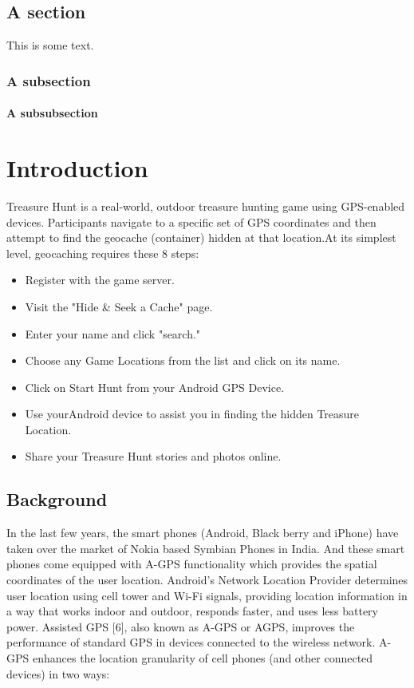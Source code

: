 \documentclass[12pt]{report}
\begin{document}
\section{A section}
This is some text.
\subsection{A subsection}
\subsubsection{A subsubsection}

\chapter{ Introduction}
	Treasure Hunt is a real-world, outdoor treasure hunting game using GPS-enabled devices. Participants navigate to a specific set of GPS coordinates and then attempt to find the geocache (container) hidden at that location.At its simplest level, geocaching requires these 8 steps:
	\begin{itemize}
	
	
	
	  \item Register with the game server.
	  \item Visit the "Hide & Seek a Cache" page.
	  \item Enter your name  and click "search."
	  \item Choose any Game Locations from the list and click on its name.
	  \item Click on Start Hunt from your Android  GPS Device.
	  \item Use yourAndroid  device to assist you in finding the hidden Treasure Location.
	   \item Share your Treasure Hunt stories and photos online.
	 
	\end{itemize}
	
	\section{Background}
	In the last few years, the smart phones (Android, Black 
	berry and iPhone) have taken over the market of Nokia 
	based Symbian Phones in India. And these smart phones 
	come equipped with A-GPS functionality which provides 
	the spatial coordinates of the user location. 
	Android's Network Location Provider determines user 
	location using cell tower and Wi-Fi signals, providing 
	location information in a way that works indoor and 
	outdoor, responds faster, and uses less battery power. 
	Assisted GPS [6], also known as A-GPS or AGPS, 
	improves the performance of standard GPS in devices 
	connected to the wireless network. A-GPS enhances the 
	location granularity of cell phones (and other connected 
	devices) in two ways: 
	
\end{document}
